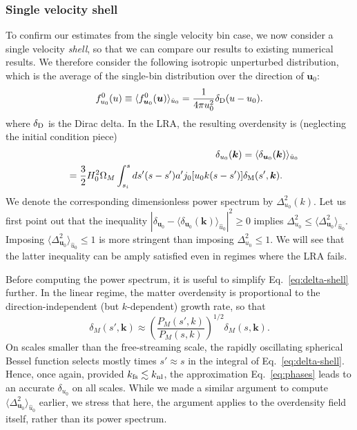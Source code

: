 \documentclass[useAMS, usenatbib]{mnras}
\newcommand{\beq}{\begin{equation}}
\newcommand{\eeq}{\end{equation}}
\newcommand{\barr}{\begin{eqnarray}}
\newcommand{\earr}{\end{eqnarray}}
\newcommand{\bs}{\boldsymbol}
\begin{document}
\subsubsection{Single velocity shell}

To confirm our estimates from the single velocity bin case, we now consider a single velocity \emph{shell}, so that we can compare our results to existing numerical results. We therefore consider the following isotropic unperturbed distribution, which is the average of the single-bin distribution over the direction of $\bs{u}_0$:
\beq
f^0_{u_0}(u) \equiv \langle f_{\bs{u}_0}^0 (\bs{u}) \rangle_{\hat{u}_0} = \frac1{4 \pi u_0^2} \delta_{\rm D}(u- u_0).
\eeq
where $\delta_{\rm D}$ is the Dirac delta. In the LRA, the resulting overdensity is (neglecting the initial condition piece)
\barr
&&\delta_{u_0}(\bs{k}) = \langle \delta_{\bs{u}_0}(\bs{k}) \rangle_{\hat{u}_0} \nonumber\\
&&= \frac32 H_0^2 \Omega_M \int_{s_i}^s ds' (s - s') a' j_0[u_0 k (s - s')] \delta_{\rm M}(s', \bs{k}).~~~~~ \label{eq:delta-shell}
\earr
We denote the corresponding dimensionless power spectrum by $\Delta^2_{u_0}(k)$. Let us first point out that the inequality $|\delta_{\bs{u}_0} - \langle \delta_{\bs{u}_0}(\bs{k}) \rangle_{\hat{u}_0}|^2 \geq 0$ implies $\Delta^2_{u_0} \leq \langle \Delta^2_{\bs{u}_0} \rangle_{\hat{u}_0}$. Imposing $\langle \Delta^2_{\bs{u}_0} \rangle_{\hat{u}_0} \leq 1$ is more stringent than imposing $\Delta^2_{u_0} \leq 1$. We will see that the latter inequality can be amply satisfied even in regimes where the LRA fails.

Before computing the power spectrum, it is useful to simplify Eq.~\eqref{eq:delta-shell} further. In the linear regime, the matter overdensity is proportional to the direction-independent (but $k$-dependent) growth rate, so that
\beq
\delta_M(s', \bs{k}) \approx \left(\frac{P_M(s', k)}{P_M(s, k)}\right)^{1/2} \delta_M(s, \bs{k}). \label{eq:phases}
\eeq
On scales smaller than the free-streaming scale, the rapidly oscillating spherical Bessel function selects mostly times $s' \approx s$ in the integral of Eq.~\eqref{eq:delta-shell}. Hence, once again, provided $k_{\rm fs} \lesssim k_{\rm nl}$, the approximation Eq.~\eqref{eq:phases} leads to an accurate $\delta_{u_0}$ on all scales. While we made a similar argument to compute $\langle \Delta^2_{\bs{u}_0} \rangle_{\hat{u}_0}$ earlier, we stress that here, the argument applies to the overdensity field itself, rather than its power spectrum.
\end{document}
